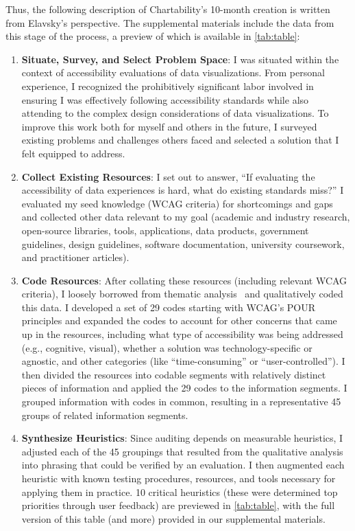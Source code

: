 \documentclass[12pt]{cmuthesis}
\begin{document}
Thus, the following description of Chartability’s 10-month creation is written from Elavsky’s perspective. The supplemental materials include the data from this stage of the process, a preview of which is available in \autoref{tab:table}: 
\begin{enumerate}
    \item \textbf{Situate, Survey, and Select Problem Space}: I was situated within the context of accessibility evaluations of data visualizations. From personal experience, I recognized the prohibitively significant labor involved in ensuring I was effectively following accessibility standards while also attending to the complex design considerations of data visualizations. To improve this work both for myself and others in the future, I surveyed existing problems and challenges others faced and selected a solution that I felt equipped to address.
    \item \textbf{Collect Existing Resources}: I set out to answer, ``If evaluating the accessibility of data experiences is hard, what do existing standards miss?'' I evaluated my seed knowledge (WCAG criteria) for shortcomings and gaps and collected other data relevant to my goal (academic and industry research, open-source libraries, tools, applications, data products, government guidelines, design guidelines, software documentation, university coursework, and practitioner articles).  
    \item \textbf{Code Resources}: After collating these resources (including relevant WCAG criteria), I loosely borrowed from thematic analysis~\cite{Braun2006Using} and qualitatively coded this data. I developed a set of 29 codes starting with WCAG's POUR principles and expanded the codes to account for other concerns that came up in the resources, including what type of accessibility was being addressed (e.g., cognitive, visual), whether a solution was technology-specific or agnostic, and other categories (like ``time-consuming'' or ``user-controlled''). I then divided the resources into codable segments with relatively distinct pieces of information and applied the 29 codes to the information segments. I grouped information with codes in common, resulting in a representative 45 groups of related information segments. 
    \item \textbf{Synthesize Heuristics}: Since auditing depends on measurable heuristics, I adjusted each of the 45 groupings that resulted from the qualitative analysis into phrasing that could be verified by an evaluation. I then augmented each heuristic with known testing procedures, resources, and tools necessary for applying them in practice. 10 critical heuristics (these were determined top priorities through user feedback) are previewed in \autoref{tab:table}, with the full version of this table (and more) provided in our supplemental materials.

\end{enumerate}
\end{document}

